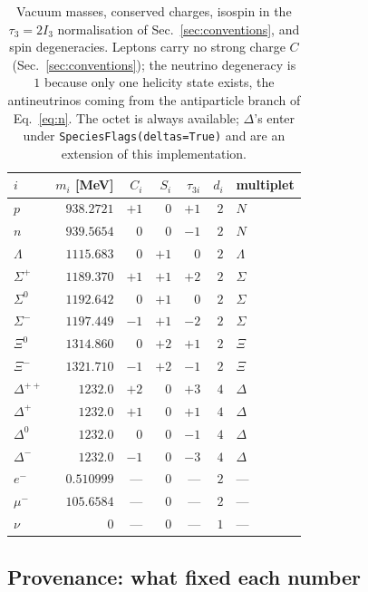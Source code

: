 \documentclass[aps,prc,onecolumn,superscriptaddress,nofootinbib,10pt]{revtex4-2}
\begin{document}
\begin{table}[h]
\centering
\begin{tabular}{lrrrrrl}
\toprule
$i$ & $m_i$ [MeV] & $C_i$ & $S_i$ & $\tau_{3i}$ & $d_i$ & multiplet \\
\midrule
$p$          & $938.2721$  & $+1$ & $0$  & $+1$ & $2$ & $N$ \\
$n$          & $939.5654$  & $0$  & $0$  & $-1$ & $2$ & $N$ \\
$\Lambda$    & $1115.683$  & $0$  & $+1$ & $0$  & $2$ & $\Lambda$ \\
$\Sigma^+$   & $1189.370$  & $+1$ & $+1$ & $+2$ & $2$ & $\Sigma$ \\
$\Sigma^0$   & $1192.642$  & $0$  & $+1$ & $0$  & $2$ & $\Sigma$ \\
$\Sigma^-$   & $1197.449$  & $-1$ & $+1$ & $-2$ & $2$ & $\Sigma$ \\
$\Xi^0$      & $1314.860$  & $0$  & $+2$ & $+1$ & $2$ & $\Xi$ \\
$\Xi^-$      & $1321.710$  & $-1$ & $+2$ & $-1$ & $2$ & $\Xi$ \\
$\Delta^{++}$& $1232.0$    & $+2$ & $0$  & $+3$ & $4$ & $\Delta$ \\
$\Delta^{+}$ & $1232.0$    & $+1$ & $0$  & $+1$ & $4$ & $\Delta$ \\
$\Delta^{0}$ & $1232.0$    & $0$  & $0$  & $-1$ & $4$ & $\Delta$ \\
$\Delta^{-}$ & $1232.0$    & $-1$ & $0$  & $-3$ & $4$ & $\Delta$ \\
\midrule
$e^-$        & $0.510999$  & --- & $0$ & --- & $2$ & --- \\
$\mu^-$      & $105.6584$  & --- & $0$ & --- & $2$ & --- \\
$\nu$        & $0$         & --- & $0$ & --- & $1$ & --- \\
\bottomrule
\end{tabular}
\caption{Vacuum masses, conserved charges, isospin in the $\tau_3 = 2I_3$
normalisation of Sec.~\ref{sec:conventions}, and spin degeneracies. Leptons
carry no strong charge $C$ (Sec.~\ref{sec:conventions}); the neutrino
degeneracy is $1$ because only one helicity state exists, the antineutrinos
coming from the antiparticle branch of Eq.~\eqref{eq:n}. The octet is always
available; $\Delta$'s enter under \texttt{SpeciesFlags(deltas=True)} and are an
extension of this implementation.}
\end{table}

\subsection{Provenance: what fixed each number}
\label{sec:provenance}
\end{document}
